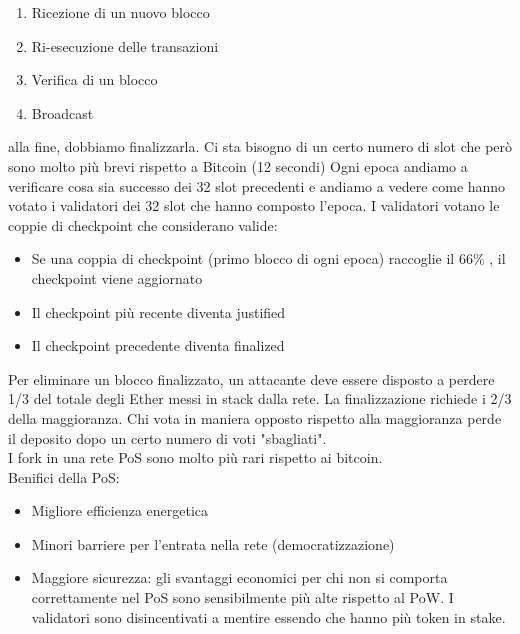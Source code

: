 \documentclass[a4paper]{article}
\begin{document}
\begin{enumerate}
    \item Ricezione di un nuovo blocco
    \item Ri-esecuzione delle transazioni
    \item Verifica di un blocco
    \item Broadcast
\end{enumerate}
alla fine, dobbiamo finalizzarla. Ci sta bisogno di un certo numero di slot che però sono molto più brevi rispetto a Bitcoin (12 secondi)
Ogni epoca andiamo a verificare cosa sia successo dei 32 slot precedenti e andiamo a vedere come hanno votato i validatori dei 32 slot che hanno composto l'epoca.
I validatori votano le coppie di checkpoint che considerano valide:
\begin{itemize}
    \item Se una coppia di checkpoint (primo blocco di ogni epoca) raccoglie il 66\% , il checkpoint viene aggiornato
    \item Il checkpoint più recente diventa justified
    \item Il checkpoint precedente diventa finalized
\end{itemize}
Per eliminare un blocco finalizzato, un attacante deve essere disposto a perdere 1/3 del totale degli Ether messi in stack dalla rete.
La finalizzazione richiede i 2/3 della maggioranza.
Chi vota in maniera opposto rispetto alla maggioranza perde il deposito dopo un certo numero di voti "sbagliati".
\\
I fork in una rete PoS sono molto più rari rispetto ai bitcoin.
\\
Benifici della PoS:
\begin{itemize}
    \item Migliore efficienza energetica
    \item Minori barriere per l'entrata nella rete (democratizzazione)
    \item Maggiore sicurezza: gli svantaggi economici per chi non si comporta correttamente nel PoS sono sensibilmente più alte rispetto al PoW. I validatori sono disincentivati a mentire essendo che hanno più token in stake.
\end{itemize}
\end{document}
